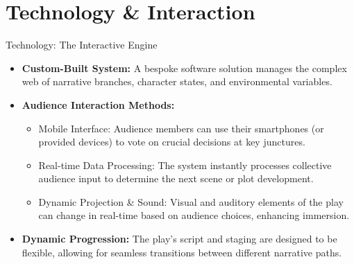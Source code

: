 \documentclass[aspectratio=169]{beamer}
\begin{document}
\section{Technology \& Interaction}
\begin{frame}{Technology: The Interactive Engine}
    \begin{itemize}
        \item \textbf{Custom-Built System:} A bespoke software solution manages the complex web of narrative branches, character states, and environmental variables.
        \item \textbf{Audience Interaction Methods:}
        \begin{itemize}
            \item Mobile Interface: Audience members can use their smartphones (or provided devices) to vote on crucial decisions at key junctures.
            \item Real-time Data Processing: The system instantly processes collective audience input to determine the next scene or plot development.
            \item Dynamic Projection \& Sound: Visual and auditory elements of the play can change in real-time based on audience choices, enhancing immersion.
        \end{itemize}
        \item \textbf{Dynamic Progression:} The play's script and staging are designed to be flexible, allowing for seamless transitions between different narrative paths.
    \end{itemize}
\end{frame}
\end{document}
